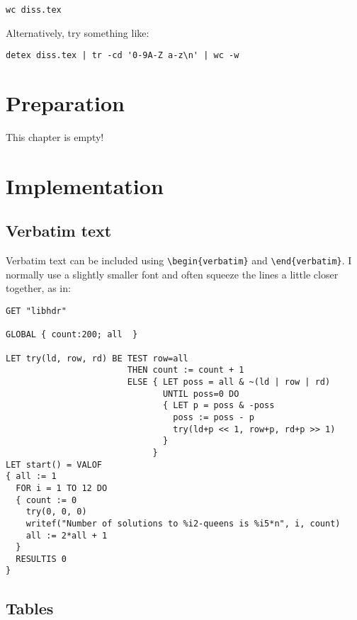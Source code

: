 \documentclass[12pt,twoside,notitlepage]{report}
\renewcommand{\baselinestretch}{1.1}    %
\begin{document}
{\tt wc diss.tex}

\noindent
Alternatively, try something like:

\verb/detex diss.tex | tr -cd '0-9A-Z a-z\n' | wc -w/




\cleardoublepage



\chapter{Preparation}

This chapter is empty!


\cleardoublepage
\chapter{Implementation}

\section{Verbatim text}

Verbatim text can be included using \verb|\begin{verbatim}| and
\verb|\end{verbatim}|. I normally use a slightly smaller font and
often squeeze the lines a little closer together, as in:

{\renewcommand{\baselinestretch}{0.8}\small\begin{verbatim}
GET "libhdr"

GLOBAL { count:200; all  }

LET try(ld, row, rd) BE TEST row=all
                        THEN count := count + 1
                        ELSE { LET poss = all & ~(ld | row | rd)
                               UNTIL poss=0 DO
                               { LET p = poss & -poss
                                 poss := poss - p
                                 try(ld+p << 1, row+p, rd+p >> 1)
                               }
                             }
LET start() = VALOF
{ all := 1
  FOR i = 1 TO 12 DO
  { count := 0
    try(0, 0, 0)
    writef("Number of solutions to %i2-queens is %i5*n", i, count)
    all := 2*all + 1
  }
  RESULTIS 0
}
\end{verbatim}
}

\section{Tables}
\end{document}
